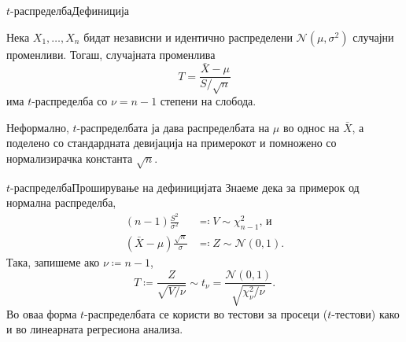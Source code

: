 \documentclass[hyperref={unicode}, xcolor={svgnames, table},
usepdftitle=false]{beamer}
\theoremstyle{remark}
\begin{document}
\begin{frame}{\(t\)-распределба}{Дефиниција}
  \begin{definition}[\(t\)-распределба]
    Нека \(X_1, \ldots, X_n\) бидат независни и идентично распределени
    \(\mathcal{N}(\mu, \sigma^2)\) случајни променливи.  Тогаш, случајната
    променлива
    \[
      T = \frac{\bar{X} - \mu}{S / {\sqrt{n}}}
    \]
    има \(t\)-распределба со \(\nu = n - 1\) степени на слобода.
  \end{definition}
  Неформално, \(t\)-распределбата ја дава распределбата на \(\mu\) во однос на
  \(\bar{X}\), а поделено со стандардната девијација на примерокот и помножено
  со нормализирачка константа \(\sqrt{n}\).
\end{frame}

\begin{frame}{\(t\)-распределба}{Проширување на дефиницијата}
  Знаеме дека за примерок од нормална распределба,
  \begin{align*}
    (n - 1) \frac{S^2}{\sigma^2} &\eqqcolon V \sim \chi^2_{n - 1}\text{, и} \\
    (\bar{X} - \mu) \frac{\sqrt{n}}{\sigma} &\eqqcolon Z \sim \mathcal{N}(0, 1)\text{.}
  \end{align*}
  Така, запишеме ако \(\nu \coloneqq n - 1\),
  \[
    T \coloneqq \frac{Z}{\sqrt{V / {\nu}}} \sim t_{\nu} = \frac{\mathcal{N}(0,
      1)}{\sqrt{\chi^2_{\nu} / {\nu}}}\text{.}
  \]
  Во оваа форма \(t\)-распределбата се користи во тестови за просеци
  (\(t\)-тестови) како и во линеарната регресиона анализа.
\end{frame}
\end{document}
